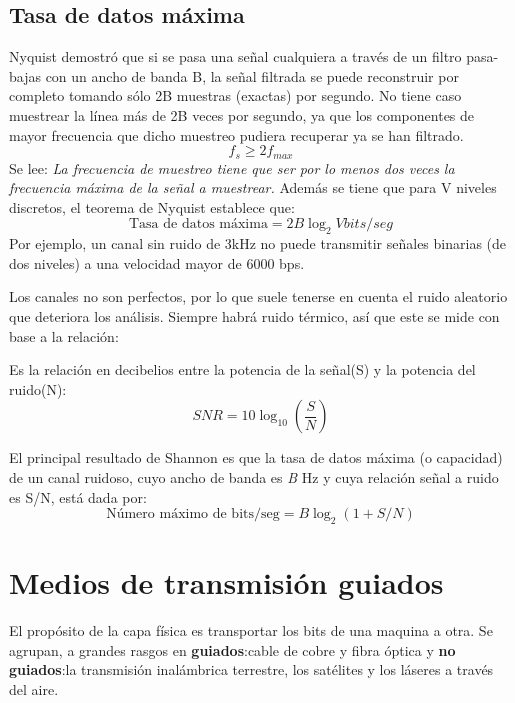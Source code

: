 \documentclass[
	11pt, %
	fleqn, %
	a4paper, %
]{LegrandOrangeBook}
\begin{document}
\subsection{Tasa de datos máxima}
\begin{definition}
Nyquist demostró que si se pasa una señal cualquiera a través de un filtro pasa-bajas con un ancho de banda B, la señal filtrada se puede reconstruir por completo tomando sólo 2B muestras (exactas) por segundo. No tiene caso muestrear la línea más de 2B veces por segundo, ya que los componentes de mayor frecuencia que dicho muestreo pudiera recuperar ya se han filtrado.
\begin{equation}
\label{eq:teorema de nyquist}
f_{s}\geq 2f_{max}
\end{equation}
Se lee: \textit{La frecuencia de muestreo tiene que ser por lo menos dos veces la frecuencia máxima de la señal a muestrear.}
Además se tiene que para V niveles discretos, el teorema de Nyquist establece que:
\begin{equation}
\label{nyquist niveles}
\text{Tasa de datos máxima}=2B\log_2Vbits/seg
\end{equation}
Por ejemplo, un canal sin ruido de 3kHz no puede transmitir señales binarias (de dos niveles) a una velocidad mayor de 6000 bps.
\end{definition}
Los canales no son perfectos, por lo que suele tenerse en cuenta el ruido aleatorio que deteriora los análisis. Siempre habrá ruido térmico, así que este se mide con base a la relación:
\begin{definition}
Es la relación en decibelios entre la potencia de la señal(S) y la potencia del ruido(N):
\begin{equation}
\label{eq:snr}
SNR=10\log_{10}\left(\frac{S}{N}\right)
\end{equation}
\end{definition}
El principal resultado de Shannon es que la tasa de datos máxima (o capacidad) de un canal ruidoso, cuyo ancho de banda es \textit{B} Hz y cuya relación señal a ruido es S/N, está dada por:
\begin{equation}
\text{Número máximo de bits/seg}=B\log_2(1+S/N)
\end{equation}
\section{Medios de transmisión guiados}
El propósito de la capa física es transportar los bits de una maquina a otra. Se agrupan, a grandes rasgos en \textbf{guiados}:cable de cobre y fibra óptica y \textbf{no guiados}:la transmisión inalámbrica terrestre, los satélites y los láseres a través del aire.
\end{document}
